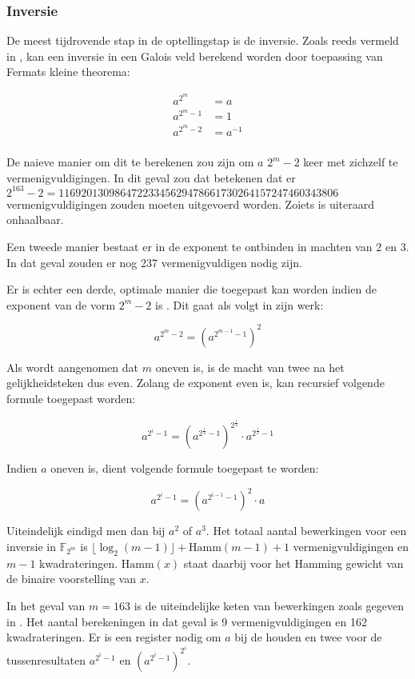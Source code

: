 \subsubsection{Inversie}

De meest tijdrovende stap in de optellingstap is de inversie.  Zoals reeds vermeld in , kan een inversie in een Galois veld berekend worden door toepassing van Fermats kleine theorema:

\[\begin{aligned}
a^{2^m}		&= a\\
a^{2^m - 1}	&= 1\\
a^{2^m - 2}	&= a^{-1}\\
\end{aligned}\]

De naieve manier om dit te berekenen zou zijn om $a$ $2^m - 2$ keer met zichzelf te vermenigvuldigingen. In dit geval zou dat betekenen dat er $2^{163} -2 = 11 692 013 098 647 223 345 629 478 661 730 264 157 247 460 343 806$ vermenigvuldigingen zouden moeten uitgevoerd worden. Zoiets is uiteraard onhaalbaar.

Een tweede manier bestaat er in de exponent te ontbinden in machten van 2 en 3. In dat geval zouden er nog 237 vermenigvuldigen nodig zijn.

Er is echter een derde, optimale manier die toegepast kan worden indien de exponent van de vorm $2^m - 2$ is \cite{batina-pkc}\cite{itoh}. Dit gaat als volgt in zijn werk:

\[a^{2^m - 2} = (a^{2^{m - 1} - 1})^2\]

Als wordt aangenomen dat $m$ oneven is, is de macht van twee na het gelijkheidsteken dus even. Zolang de exponent even is, kan recursief volgende formule toegepast worden:

\[a^{2^i - 1} = (a^{2^{\frac{i}{2}} - 1})^{2^{\frac{i}{2}}} \cdot a^{2^{\frac{i}{2}} - 1}\]

Indien $a$ oneven is, dient volgende formule toegepast te worden:

\[a^{2^i - 1} = (a^{2^{i - 1} - 1})^2 \cdot a\]

Uiteindelijk eindigd men dan bij $a^2$ of $a^3$. Het totaal aantal bewerkingen voor een inversie in $\mathbb{F}_{2^m}$ is $\lfloor\log_2(m - 1)\rfloor + \text{Hamm}(m - 1) + 1$ vermenigvuldigingen en $m - 1$ kwadrateringen. $\text{Hamm}(x)$ staat daarbij voor het Hamming gewicht van de binaire voorstelling van $x$.

In het geval van $m = 163$ is de uiteindelijke keten van bewerkingen zoals gegeven in . Het aantal berekeningen in dat geval is 9 vermenigvuldigingen en 162 kwadrateringen. Er is een register nodig om $a$ bij de houden en twee voor de tussenresultaten $a^{2^i - 1}$ en $(a^{2^i - 1})^{2^i}$.

